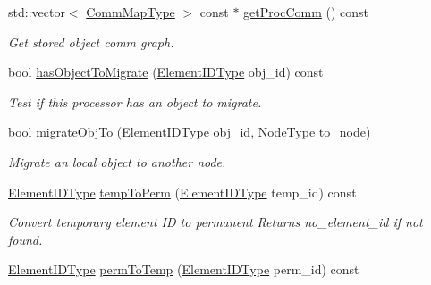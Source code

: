 \begin{DoxyCompactItemize}
std\+::vector$<$ \hyperlink{namespacevt_1_1vrt_1_1collection_1_1balance_a10860c956804d644db54a16012352728}{Comm\+Map\+Type} $>$ const  $\ast$ \hyperlink{structvt_1_1vrt_1_1collection_1_1balance_1_1_proc_stats_ab8fb4abaaf87156825e60cf43b74ca34}{get\+Proc\+Comm} () const
\begin{DoxyCompactList}\small\item\em Get stored object comm graph. \end{DoxyCompactList}\item 
bool \hyperlink{structvt_1_1vrt_1_1collection_1_1balance_1_1_proc_stats_a8ee38def0f38270f9b3dbbae19b027ce}{has\+Object\+To\+Migrate} (\hyperlink{namespacevt_1_1vrt_1_1collection_1_1balance_a14c8d2c972f2913aa3f1636e5be0a120}{Element\+I\+D\+Type} obj\+\_\+id) const
\begin{DoxyCompactList}\small\item\em Test if this processor has an object to migrate. \end{DoxyCompactList}\item 
bool \hyperlink{structvt_1_1vrt_1_1collection_1_1balance_1_1_proc_stats_ad8a4cff0e1259002ed45b5c8f1b43d26}{migrate\+Obj\+To} (\hyperlink{namespacevt_1_1vrt_1_1collection_1_1balance_a14c8d2c972f2913aa3f1636e5be0a120}{Element\+I\+D\+Type} obj\+\_\+id, \hyperlink{namespacevt_a866da9d0efc19c0a1ce79e9e492f47e2}{Node\+Type} to\+\_\+node)
\begin{DoxyCompactList}\small\item\em Migrate an local object to another node. \end{DoxyCompactList}\item 
\hyperlink{namespacevt_1_1vrt_1_1collection_1_1balance_a14c8d2c972f2913aa3f1636e5be0a120}{Element\+I\+D\+Type} \hyperlink{structvt_1_1vrt_1_1collection_1_1balance_1_1_proc_stats_afed5b2ba3c677167d38ae12c012ff993}{temp\+To\+Perm} (\hyperlink{namespacevt_1_1vrt_1_1collection_1_1balance_a14c8d2c972f2913aa3f1636e5be0a120}{Element\+I\+D\+Type} temp\+\_\+id) const
\begin{DoxyCompactList}\small\item\em Convert temporary element ID to permanent Returns {\ttfamily no\+\_\+element\+\_\+id} if not found. \end{DoxyCompactList}\item 
\hyperlink{namespacevt_1_1vrt_1_1collection_1_1balance_a14c8d2c972f2913aa3f1636e5be0a120}{Element\+I\+D\+Type} \hyperlink{structvt_1_1vrt_1_1collection_1_1balance_1_1_proc_stats_a5b3d280cadc1a2d06de37b5d2da41ba8}{perm\+To\+Temp} (\hyperlink{namespacevt_1_1vrt_1_1collection_1_1balance_a14c8d2c972f2913aa3f1636e5be0a120}{Element\+I\+D\+Type} perm\+\_\+id) const

\end{DoxyCompactItemize}
